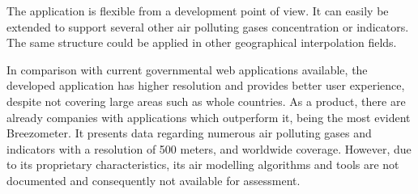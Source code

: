 The application is flexible from a development point of view. It can easily be extended to support several other air polluting gases concentration or indicators. The same structure could be applied in other geographical interpolation fields.

In comparison with current governmental web applications available, the developed application has higher resolution and provides better user experience, despite not covering large areas such as whole countries. As a product, there are already companies with applications which outperform it, being the most evident Breezometer. It presents data regarding numerous air polluting gases and indicators with a resolution of 500 meters, and worldwide coverage. However, due to its proprietary characteristics, its air modelling algorithms and tools are not documented and consequently not available for assessment.
